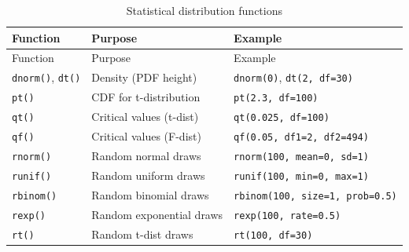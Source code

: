 \documentclass[
  letterpaper,
  DIV=11,
  numbers=noendperiod]{scrreprt}
\begin{document}
\begin{longtable}[]{@{}
  >{\raggedright\arraybackslash}p{}
  >{\raggedright\arraybackslash}p{}
  >{\raggedright\arraybackslash}p{}@{}}
\caption{Statistical distribution
functions}\label{tbl-dist-ref}\tabularnewline
\toprule\noalign{}
\begin{minipage}[b]{\linewidth}\raggedright
Function
\end{minipage} & \begin{minipage}[b]{\linewidth}\raggedright
Purpose
\end{minipage} & \begin{minipage}[b]{\linewidth}\raggedright
Example
\end{minipage} \\
\midrule\noalign{}
\endfirsthead
\toprule\noalign{}
\begin{minipage}[b]{\linewidth}\raggedright
Function
\end{minipage} & \begin{minipage}[b]{\linewidth}\raggedright
Purpose
\end{minipage} & \begin{minipage}[b]{\linewidth}\raggedright
Example
\end{minipage} \\
\midrule\noalign{}
\endhead
\bottomrule\noalign{}
\endlastfoot
\texttt{dnorm()}, \texttt{dt()} & Density (PDF height) &
\texttt{dnorm(0)}, \texttt{dt(2,\ df=30)} \\
\texttt{pt()} & CDF for t-distribution & \texttt{pt(2.3,\ df=100)} \\
\texttt{qt()} & Critical values (t-dist) &
\texttt{qt(0.025,\ df=100)} \\
\texttt{qf()} & Critical values (F-dist) &
\texttt{qf(0.05,\ df1=2,\ df2=494)} \\
\texttt{rnorm()} & Random normal draws &
\texttt{rnorm(100,\ mean=0,\ sd=1)} \\
\texttt{runif()} & Random uniform draws &
\texttt{runif(100,\ min=0,\ max=1)} \\
\texttt{rbinom()} & Random binomial draws &
\texttt{rbinom(100,\ size=1,\ prob=0.5)} \\
\texttt{rexp()} & Random exponential draws &
\texttt{rexp(100,\ rate=0.5)} \\
\texttt{rt()} & Random t-dist draws & \texttt{rt(100,\ df=30)} \\
\end{longtable}
\end{document}
